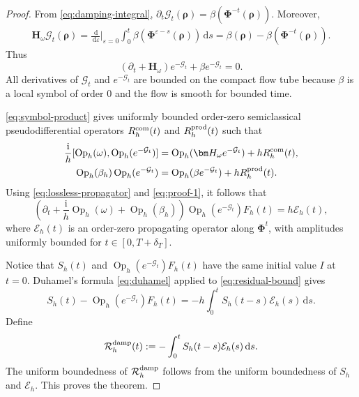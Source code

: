 \documentclass[11pt,reqno]{amsart}
\newcommand{\ii}{\mathrm{i}}
\newcommand{\dd}{\,\mathrm{d}}
\newcommand{\Op}{\operatorname{Op}}
\numberwithin{equation}{section}
\begin{document}
\begin{proof}
From \eqref{eq:damping-integral},
$\partial_t\mathcal G_t(\bm\rho)=\beta(\bm\Phi^{-t}(\bm\rho))$. Moreover,
\begin{align*}
\bm H_\omega\mathcal G_t(\bm\rho)=\frac{\dd}{\dd\varepsilon}\bigg|_{\varepsilon=0}\int_0^t\beta(\bm\Phi^{\varepsilon-s}(\bm\rho))\dd s=\beta(\bm\rho)-\beta(\bm\Phi^{-t}(\bm\rho)).
\end{align*}
Thus
\begin{equation}\label{eq:proof-1}
 (\partial_t+\bm H_\omega)e^{-\mathcal G_t}
 +\beta e^{-\mathcal G_t}=0.
\end{equation}
All derivatives of $\mathcal G_t$ and $e^{-\mathcal G_t}$ are bounded on the compact flow tube because $\beta$ is a local symbol of order $0$ and the flow is smooth for bounded time.

\eqref{eq:symbol-product} gives uniformly bounded order-zero semiclassical pseudodifferential operators $R_h^{\rm com}(t)$ and $R_h^{\rm prod}(t)$ such that
\begin{align*}
 \frac{\ii}{h}[\Op_h(\omega),\Op_h(e^{-\mathcal G_t})]&=\Op_h(\bm H_\omega e^{-\mathcal G_t})+hR_h^{\rm com}(t),\\
 \Op_h(\beta_h)\Op_h(e^{-\mathcal G_t})&=\Op_h(\beta e^{-\mathcal G_t})+hR_h^{\rm prod}(t).
\end{align*}
Using \eqref{eq:lossless-propagator} and \eqref{eq:proof-1}, it follows that
\begin{equation}\label{eq:residual-bound}
 \left(\partial_t+\frac{\ii}{h}\Op_h(\omega)+\Op_h(\beta_h)\right)
 \Op_h(e^{-\mathcal G_t})F_h(t)
 =h\mathcal E_h(t),
\end{equation}
where $\mathcal E_h(t)$ is an order-zero propagating operator along $\bm\Phi^t$, with amplitudes uniformly bounded for $t\in[0,T+\delta_T]$.

Notice that $S_h(t)$ and $\Op_h(e^{-\mathcal G_t})F_h(t)$ have the same initial value $I$ at $t=0$. Duhamel's formula \eqref{eq:duhamel} applied to \eqref{eq:residual-bound} gives
\begin{equation*}
 S_h(t)-\Op_h(e^{-\mathcal G_t})F_h(t)=-h\int_0^tS_h(t-s)\mathcal E_h(s)\dd s.
\end{equation*}
Define
$$
    \mathcal R_h^{\rm damp}(t):=-\int_0^t S_h(t-s)\mathcal E_h(s)\dd s.
$$
The uniform boundedness of $\mathcal R_h^{\rm damp}$ follows from the uniform boundedness of $S_h$ and $\mathcal E_h$. This proves the theorem.
\end{proof}
\end{document}
